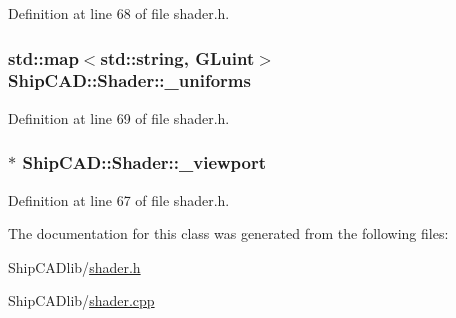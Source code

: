 Definition at line 68 of file shader.\+h.

\subsubsection[{\texorpdfstring{\+\_\+uniforms}{_uniforms}}]{\setlength{\rightskip}{0pt plus 5cm}std\+::map$<$std\+::string, G\+Luint$>$ Ship\+C\+A\+D\+::\+Shader\+::\+\_\+uniforms\hspace{0.3cm}{\ttfamily [protected]}}\hypertarget{classShipCAD_1_1Shader_a5c98e4ae6e3403f179a3fcf204b34baf}{}\label{classShipCAD_1_1Shader_a5c98e4ae6e3403f179a3fcf204b34baf}


Definition at line 69 of file shader.\+h.

\subsubsection[{\texorpdfstring{\+\_\+viewport}{_viewport}}]{$\ast$ Ship\+C\+A\+D\+::\+Shader\+::\+\_\+viewport\hspace{0.3cm}{\ttfamily [protected]}}\hypertarget{classShipCAD_1_1Shader_a0ee19c28f4fd4260b70095ccd433d546}{}\label{classShipCAD_1_1Shader_a0ee19c28f4fd4260b70095ccd433d546}


Definition at line 67 of file shader.\+h.



The documentation for this class was generated from the following files\+:\begin{DoxyCompactItemize}
\item 
Ship\+C\+A\+Dlib/\hyperlink{shader_8h}{shader.\+h}\item 
Ship\+C\+A\+Dlib/\hyperlink{shader_8cpp}{shader.\+cpp}\end{DoxyCompactItemize}
